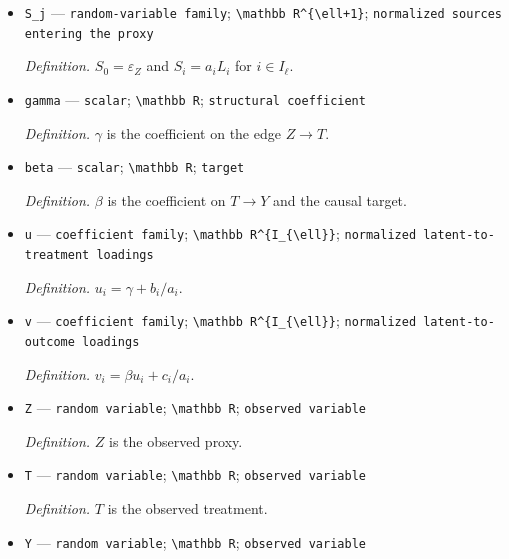 \documentclass{article}
\begin{document}
\begin{itemize}
  \item \texttt{S\_\allowbreak{}j} --- \texttt{random-\allowbreak{}variable family}; \texttt{\textbackslash{}\allowbreak{}mathbb R\textasciicircum{}\{\textbackslash{}\allowbreak{}ell+\allowbreak{}1\}\allowbreak{}}; \texttt{normalized sources entering the proxy}
  \par\smallskip\noindent\emph{Definition.} \(S_0=\varepsilon_Z\) and \(S_i=a_iL_i\) for \(i\in I_{\ell}\).
  \item \texttt{gamma} --- \texttt{scalar}; \texttt{\textbackslash{}\allowbreak{}mathbb R}; \texttt{structural coefficient}
  \par\smallskip\noindent\emph{Definition.} \(\gamma\) is the coefficient on the edge \(Z\to T\).
  \item \texttt{beta} --- \texttt{scalar}; \texttt{\textbackslash{}\allowbreak{}mathbb R}; \texttt{target}
  \par\smallskip\noindent\emph{Definition.} \(\beta\) is the coefficient on \(T\to Y\) and the causal target.
  \item \texttt{u} --- \texttt{coefficient family}; \texttt{\textbackslash{}\allowbreak{}mathbb R\textasciicircum{}\{I\_\allowbreak{}\{\textbackslash{}\allowbreak{}ell\}\allowbreak{}\}\allowbreak{}}; \texttt{normalized latent-\allowbreak{}to-\allowbreak{}treatment loadings}
  \par\smallskip\noindent\emph{Definition.} \(u_i=\gamma+b_i/a_i\).
  \item \texttt{v} --- \texttt{coefficient family}; \texttt{\textbackslash{}\allowbreak{}mathbb R\textasciicircum{}\{I\_\allowbreak{}\{\textbackslash{}\allowbreak{}ell\}\allowbreak{}\}\allowbreak{}}; \texttt{normalized latent-\allowbreak{}to-\allowbreak{}outcome loadings}
  \par\smallskip\noindent\emph{Definition.} \(v_i=\beta u_i+c_i/a_i\).
  \item \texttt{Z} --- \texttt{random variable}; \texttt{\textbackslash{}\allowbreak{}mathbb R}; \texttt{observed variable}
  \par\smallskip\noindent\emph{Definition.} \(Z\) is the observed proxy.
  \item \texttt{T} --- \texttt{random variable}; \texttt{\textbackslash{}\allowbreak{}mathbb R}; \texttt{observed variable}
  \par\smallskip\noindent\emph{Definition.} \(T\) is the observed treatment.
  \item \texttt{Y} --- \texttt{random variable}; \texttt{\textbackslash{}\allowbreak{}mathbb R}; \texttt{observed variable}

\end{itemize}
\end{document}

